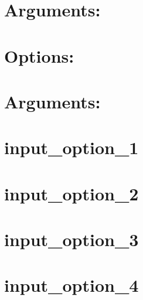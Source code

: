 \documentclass[twoside]{book}
\newcommand{\+}{\discretionary{\mbox{\scriptsize$\hookleftarrow$}}{}{}}
\begin{document}
\chapter{Arguments\+:}
\label{md_vendor_symfony_console__symfony__component__console__tests__fixtures_input_definition_2}

\chapter{Options\+:}
\label{md_vendor_symfony_console__symfony__component__console__tests__fixtures_input_definition_3}

\chapter{Arguments\+:}
\label{md_vendor_symfony_console__symfony__component__console__tests__fixtures_input_definition_4}

\chapter{input\+\_\+option\+\_\+1}
\label{md_vendor_symfony_console__symfony__component__console__tests__fixtures_input_option_1}

\chapter{input\+\_\+option\+\_\+2}
\label{md_vendor_symfony_console__symfony__component__console__tests__fixtures_input_option_2}

\chapter{input\+\_\+option\+\_\+3}
\label{md_vendor_symfony_console__symfony__component__console__tests__fixtures_input_option_3}

\chapter{input\+\_\+option\+\_\+4}
\label{md_vendor_symfony_console__symfony__component__console__tests__fixtures_input_option_4}

\end{document}
